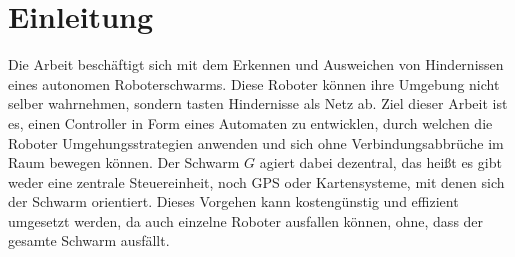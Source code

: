 \section{Einleitung}

Die Arbeit beschäftigt sich mit dem Erkennen und Ausweichen von Hindernissen eines autonomen 
Roboterschwarms. Diese Roboter können ihre Umgebung nicht selber wahrnehmen, sondern tasten Hindernisse als
Netz ab. Ziel dieser Arbeit ist es, einen Controller in Form eines Automaten zu entwicklen, durch welchen
die Roboter Umgehungsstrategien anwenden und sich ohne Verbindungsabbrüche im Raum bewegen können. Der
Schwarm $G$ agiert dabei dezentral, das heißt es gibt weder eine zentrale Steuereinheit, noch GPS oder 
Kartensysteme, mit denen sich der Schwarm orientiert. Dieses Vorgehen kann kostengünstig und effizient
umgesetzt werden, da auch einzelne Roboter ausfallen können, ohne, dass der gesamte Schwarm ausfällt.